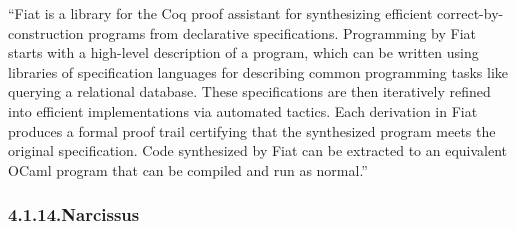 \documentclass[12pt,twoside]{article}
\begin{document}
\noindent{}\textquotedblleft{}Fiat is a library for the Coq proof assistant for synthesizing
efficient correct-by-construction programs from declarative
specifications. Programming by Fiat starts with a high-level
description of a program, which can be written using libraries of
specification languages for describing common programming tasks like
querying a relational database. These specifications are then
iteratively refined into efficient implementations via automated
tactics. Each derivation in Fiat produces a formal proof trail
certifying that the synthesized program meets the original
specification. Code synthesized by Fiat can be extracted to an
equivalent OCaml program that can be compiled and run as normal.\textquotedblright{}%

\subsubsection{4.1.14.\hspace*{0.5em}Narcissus}%
\end{document}
